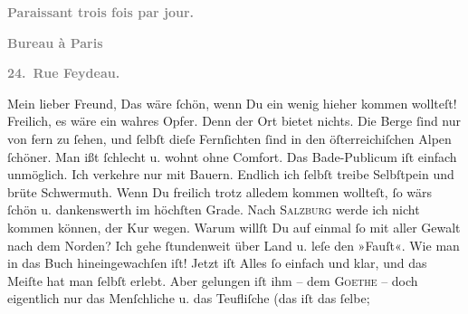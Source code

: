 \begin{ledgroupsized}[t]{13cm}
           \pstart
           \begin{otherlanguage}{french}\textcolor{gray}{\textbf{\textbf{Paraissant trois fois par jour.}}}\end{otherlanguage}\pend
           \pstart
           \begin{otherlanguage}{french}\textcolor{gray}{\textbf{\textbf{Bureau à Paris}}}\end{otherlanguage}\pend
           \pstart
           \begin{otherlanguage}{french}\textcolor{gray}{\textbf{\textbf{24. Rue Feydeau.}}}\end{otherlanguage}\pend
           \pstart\center{}Mein lieber Freund,\pend\pstart
           Das wäre ſchön, wenn Du ein wenig hieher kommen wollteſt! Freilich, es wäre ein
               wahres Opfer. Denn der Ort
               bietet nichts. Die Berge ſind nur von fern zu ſehen, und ſelbſt dieſe Fernſichten
               ſind in den öſterreichiſchen Alpen ſchöner. Man ißt ſchlecht u. wohnt ohne Comfort. Das
               Bade-Publicum iſt einfach unmöglich. Ich verkehre nur mit Bauern. {\pb}Endlich ich ſelbſt  treibe Selbſtpein und brüte Schwermuth. Wenn Du freilich trotz alledem kommen
               wollteſt, ſo wärs ſchön u. dankenswerth im höchſten Grade.\pend
           \pstart
           Nach \textsc{Salzburg} werde ich nicht kommen können, der Kur wegen.\pend
           \pstart
           Warum willſt Du auf einmal ſo mit aller Gewalt nach dem Norden?\pend
           \pstart
           Ich gehe ſtundenweit über Land u. leſe den »Fauſt«. Wie man in das {\pb}Buch hineingewachſen iſt!
               Jetzt iſt Alles ſo einfach und klar, und das Meiſte hat man ſelbſt erlebt. Aber
               gelungen iſt ihm – dem \textsc{Goethe} – doch eigentlich nur das Menſchliche u. das Teufliſche (das iſt das ſelbe;

\end{ledgroupsized}
